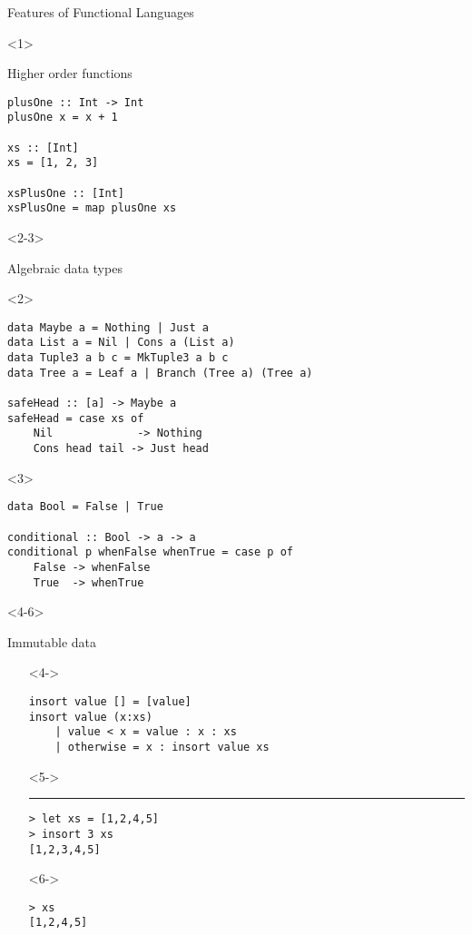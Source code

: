 \documentclass{beamer}
\begin{document}
\begin{frame}[fragile]{Features of Functional Languages}
  \begin{onlyenv}<1>
    \begin{block}{Higher order functions}
      \begin{verbatim}
plusOne :: Int -> Int
plusOne x = x + 1

xs :: [Int]
xs = [1, 2, 3]

xsPlusOne :: [Int]
xsPlusOne = map plusOne xs
      \end{verbatim}
    \end{block}
  \end{onlyenv}

  \begin{onlyenv}<2-3>
    \begin{block}{Algebraic data types}
      \begin{onlyenv}<2>
        \begin{verbatim}
data Maybe a = Nothing | Just a
data List a = Nil | Cons a (List a)
data Tuple3 a b c = MkTuple3 a b c
data Tree a = Leaf a | Branch (Tree a) (Tree a)

safeHead :: [a] -> Maybe a
safeHead = case xs of
    Nil             -> Nothing
    Cons head tail -> Just head
        \end{verbatim}
      \end{onlyenv}

      \begin{onlyenv}<3>
        \begin{verbatim}
data Bool = False | True

conditional :: Bool -> a -> a
conditional p whenFalse whenTrue = case p of
    False -> whenFalse
    True  -> whenTrue
        \end{verbatim}
      \end{onlyenv}
    \end{block}
  \end{onlyenv}

  \begin{onlyenv}<4-6>
    \begin{block}{Immutable data}
      \begin{itemize}
      \item[]<4-> \begin{verbatim}
insort value [] = [value]
insort value (x:xs)
    | value < x = value : x : xs
    | otherwise = x : insort value xs
        \end{verbatim}
      \item[]<5-> \rule{\textwidth}{0.4pt} \begin{verbatim}
> let xs = [1,2,4,5]
> insort 3 xs
[1,2,3,4,5]
        \end{verbatim}
      \item[]<6-> \begin{verbatim}
> xs
[1,2,4,5]
        \end{verbatim}
      \end{itemize}
    \end{block}
  \end{onlyenv}


\end{frame}
\end{document}
